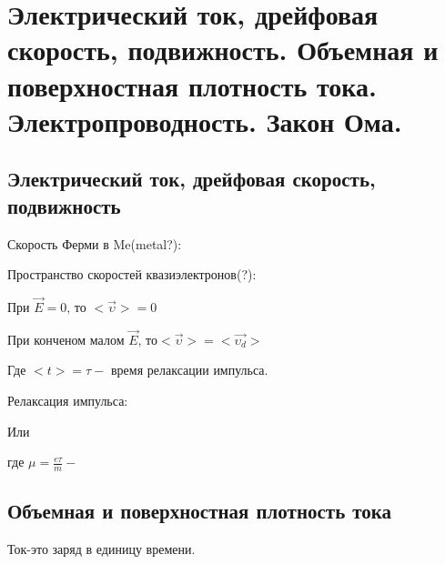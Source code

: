 \section{Электрический ток, дрейфовая скорость, подвижность. Объемная и
поверхностная плотность тока. Электропроводность. Закон Ома.}

\subsection*{Электрический ток, дрейфовая скорость, подвижность}

Скорость Ферми в Me(metal?):



\newpage

Пространство скоростей квазиэлектронов(?):


При $\vec{E}=0\text{, то }<\vec{\upsilon}>=0$

При конченом малом $\vec{E}\text{, то} <\vec{\upsilon}>=<\vec{\upsilon_d}>$



Где $<t>=\tau-$ время релаксации импульса.

Релаксация импульса:

Или


где $\mu=\frac{e\tau }{m}-$

\newpage

\subsection*{Объемная и поверхностная плотность тока}

Ток-это заряд в единицу времени.

 


